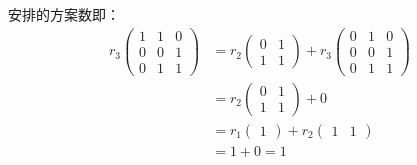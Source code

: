 \begin{solution}
    安排的方案数即：
    \begin{align*}
        r_3\left(\begin{matrix}
            1 & 1 & 0 \\
            0 & 0 & 1 \\
            0 & 1 & 1
           \end{matrix} \right)
           &=r_2\left(\begin{matrix}
            0 & 1 \\
            1 & 1
           \end{matrix} \right)+r_3\left(\begin{matrix}
            0 & 1 & 0 \\
            0 & 0 & 1 \\
            0 & 1 & 1
           \end{matrix} \right)\\
           &=r_2\left(\begin{matrix}
            0 & 1 \\
            1 & 1
           \end{matrix} \right)+0\\
           &=r_1\left(\begin{matrix}
            1
           \end{matrix}\right)+r_2\left(\begin{matrix}
            1 & 1
           \end{matrix}\right)\\
           &=1+0=1
    \end{align*}
\end{solution}